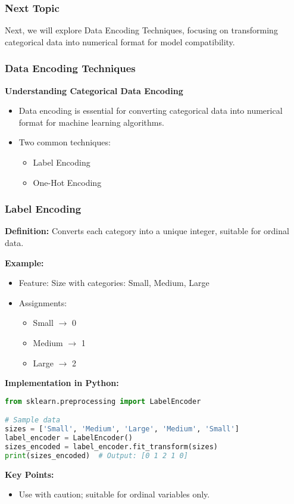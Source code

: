 \documentclass{beamer}
\begin{document}
\begin{frame}[fragile]
    \frametitle{Next Topic}
    Next, we will explore Data Encoding Techniques, focusing on transforming categorical data into numerical format for model compatibility.
\end{frame}

\begin{frame}
    \frametitle{Data Encoding Techniques}
    \textbf{Understanding Categorical Data Encoding}

    \begin{itemize}
        \item Data encoding is essential for converting categorical data into numerical format for machine learning algorithms.
        \item Two common techniques:
        \begin{itemize}
            \item Label Encoding
            \item One-Hot Encoding
        \end{itemize}
    \end{itemize}
\end{frame}

\begin{frame}[fragile]
    \frametitle{Label Encoding}
    
    \textbf{Definition:} Converts each category into a unique integer, suitable for ordinal data.

    \textbf{Example:}
    \begin{itemize}
        \item Feature: Size with categories: Small, Medium, Large
        \item Assignments:
        \begin{itemize}
            \item Small $\to$ 0
            \item Medium $\to$ 1
            \item Large $\to$ 2
        \end{itemize}
    \end{itemize}

    \textbf{Implementation in Python:}
    \begin{lstlisting}[language=Python]
from sklearn.preprocessing import LabelEncoder

# Sample data
sizes = ['Small', 'Medium', 'Large', 'Medium', 'Small']
label_encoder = LabelEncoder()
sizes_encoded = label_encoder.fit_transform(sizes)
print(sizes_encoded)  # Output: [0 1 2 1 0]
    \end{lstlisting}

    \textbf{Key Points:}
    \begin{itemize}
        \item Use with caution; suitable for ordinal variables only.
    \end{itemize}
\end{frame}
\end{document}

